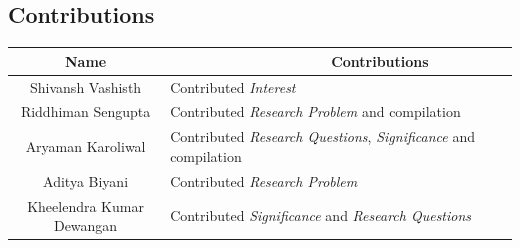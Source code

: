 \documentclass[12pt, twoside]{report}
\title{}
\author{Riddhiman}
\date{\monthyeardate\today}
\begin{document}



\begin{center}
	\section*{Contributions}%
	\begingroup
		\setlength{\tabcolsep}{10pt}
		\renewcommand{\arraystretch}{1.8}
		\begin{tabular} { ||c|p{81mm}|| }
			\hline
			\textbf{Name} & \ \ \ \ \ \ \ \ \ \ \ \ \ \ \ \ \ \ \ \  \textbf{Contributions} \\ [0.5ex]
			\hline \hline

			\hline  
			Shivansh Vashisth & Contributed \textit{Interest} \\ 
			\hline
			Riddhiman Sengupta & Contributed \textit{Research Problem} and compilation \\
			\hline
			Aryaman Karoliwal & Contributed \textit{Research Questions}, \textit{Significance} and compilation \\
			\hline
			Aditya Biyani & Contributed \textit{Research Problem} \\
			\hline
			Kheelendra Kumar Dewangan & Contributed \textit{Significance} and \textit{Research Questions} \\
			[1ex]
			\hline
		\end{tabular}
		\endgroup
\end{center}


\newpage 
\end{document}
